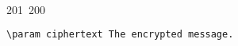 201~200~\documentclass{article}
\begin{document}
\begin{lstlisting}[language=Python, caption=Decrypting a Message with ChaCha20-Poly1305]
	                                                                                                                                                                                                                                                                                                	                                                                                                                                        	    	                                                                                                	                                                                                                                                                                                                                                                                                                                                	                                                                        	                                                                        	                                                                                                                                        	                                                                                                                                                                                                                        	                                                                                                                            	                                                                	                                                                                                                                                                \param ciphertext The encrypted message.

\end{lstlisting}
\end{document}

